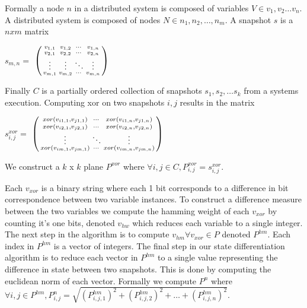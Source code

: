 Formally a node $n$ in a distributed system is composed of variables $V \in
v_1,v_2\dots v_n$. A distributed system is composed of nodes $N \in n_1, n_2,
\dots , n_m$. A snapshot $s$ is a $n x m$ matrix

$s_{m,n} = $
$\begin{psmallmatrix}
  v_{1,1} & v_{1,2} & \cdots & v_{1,n} \\
  v_{2,1} & v_{2,2} & \cdots & v_{2,n} \\
  \vdots  & \vdots  & \ddots & \vdots  \\
  v_{m,1} & v_{m,2} & \cdots & v_{m,n} 
 \end{psmallmatrix}$

Finally $C$ is a partially ordered collection of snapshots $s_1, s_2, \dots
s_k$ from a systems execution. Computing xor on two snapshots $i,j$ results in
the matrix 




$s^{xor}_{i,j} = $
$\begin{psmallmatrix}
    xor(v_{i1,1},v_{j1,1}) & \cdots & xor(v_{i1,n},v_{j1,n}) \\
    xor(v_{i2,1},v_{j2,1})  & \cdots & xor(v_{i2,n},v_{j2,n}) \\
    \vdots  & \ddots & \vdots  \\
    xor(v_{im,1},v_{jm,1}) & \cdots & xor(v_{im,n},v_{jm,n}) \\
 \end{psmallmatrix}$

We construct a $k$ x $k$ plane $P^{xor}$ where $\forall i,j \in C, P^{xor}_{i,j} =
s^{xor}_{i,j}$.

Each $v_{xor}$ is a binary string where each 1 bit corresponds to a difference
in bit correspondence between two variable instances. To construct a difference
measure between the two variables we compute the hamming weight of each
$v_{xor}$ by counting it's one bits, denoted $v_{hw}$ which reduces each
variable to a single integer. The next step in the algorithm is to compute
$v_{hm} \forall v_{xor} \in P$ denoted $P^{hm}$. Each index in $P^{hm}$ is a
vector of integers. The final step in our state differentiation algorithm is to
reduce each vector in $P^{hm}$ to a single value representing the difference in
state between two snapshots. This is done by computing the euclidean norm of
each vector. Formally we compute $P^n$ where $\forall i,j \in P^{hm}, P^n_{i,j}
= \sqrt{(P^{hm}_{i,j,1})^2 + (P^{hm}_{i,j,2})^2 +\dots + (P^{hm}_{i,j,n})^2 }$.

